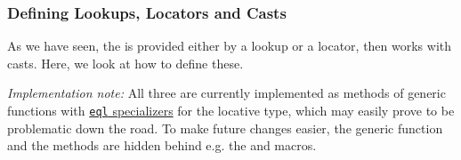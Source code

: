 \begin{itemize}
\begin{Shaded}
\begin{Highlighting}[]
\NormalTok{(}\NormalTok{()}
\OperatorTok{\textgreater{}}
\OperatorTok{*}\NormalTok{ \textquotesingle{}(}
\OperatorTok{=\textgreater{}}
\OperatorTok{**}\NormalTok{ \textquotesingle{}(}
\OperatorTok{=\textgreater{}}
\end{Highlighting}
\end{Shaded}
\end{itemize}

\subsubsection{Defining Lookups, Locators and
Casts}\label{defining-lookups-locators-and-casts}

\label{x-28DREF-EXT-3A-40DEFINING-LOOKUPS-LOCATORS-AND-CASTS-20MGL-PAX-3ASECTION-29}

As we have seen, the
 is provided either by a lookup or a locator, then
works with casts. Here, we look at how to define these.

\emph{Implementation note:} All three are currently implemented as
methods of generic functions with
\href{http://www.lispworks.com/documentation/HyperSpec/Body/07_fb.htm}{\texttt{eql}
specializers} for the locative type, which may easily prove to be
problematic down the road. To make future changes easier, the generic
function and the methods are hidden behind e.g. the
and
macros.

